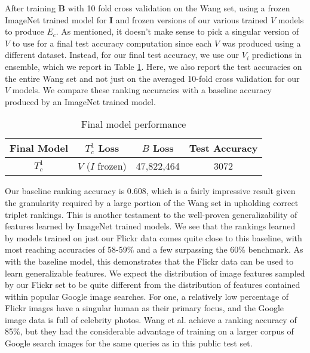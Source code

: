 After training \textbf{B} with 10 fold cross validation on the Wang set, using a frozen ImageNet trained model for \textbf{I} and frozen versions of our various trained $V$ models to produce $E_c$. As mentioned, it doesn't make sense to pick a singular version of $V$ to use for a final test accuracy computation since each $V$ was produced using a different dataset. Instead, for our final test accuracy, we use our $V_i$ predictions in ensemble, which we report in Table \ref{table:final_test}. Here, we also report the test accuracies on the entire Wang set and not just on the averaged 10-fold cross validation for our $V$ models. We compare these ranking accuracies with a baseline accuracy produced by an ImageNet trained model.

\begin{table}
	\centering
	\begin{tabular}{*{4}{c}}
		\toprule
		\bfseries Final Model & \bfseries $T_c^1$ Loss & \bfseries $B$ Loss & \bfseries Test Accuracy\\
		\midrule
		$T_c^1$ & $V$ ($I$ frozen) & 47,822,464 & 3072\\
		\bottomrule
	\end{tabular}
	\caption{Final model performance}
	\label{table:final_test}
\end{table}

Our baseline ranking accuracy is 0.608, which is a fairly impressive result given the granularity required by a large portion of the Wang set in upholding correct triplet rankings. This is another testament to the well-proven generalizability of features learned by ImageNet trained models. We see that the rankings learned by models trained on just our Flickr data comes quite close to this baseline, with most reaching accuracies of 58-59\% and a few surpassing the 60\% benchmark. As with the baseline model, this demonstrates that the Flickr data can be used to learn generalizable features. We expect the distribution of image features sampled by our Flickr set to be quite different from the distribution of features contained within popular Google image searches. For one, a relatively low percentage of Flickr images have a singular human as their primary focus, and the Google image data is full of celebrity photos. Wang et al. achieve a ranking accuracy of 85\%, but they had the considerable advantage of training on a larger corpus of Google search images for the same queries as in this public test set.\cite{wang2014learning}

